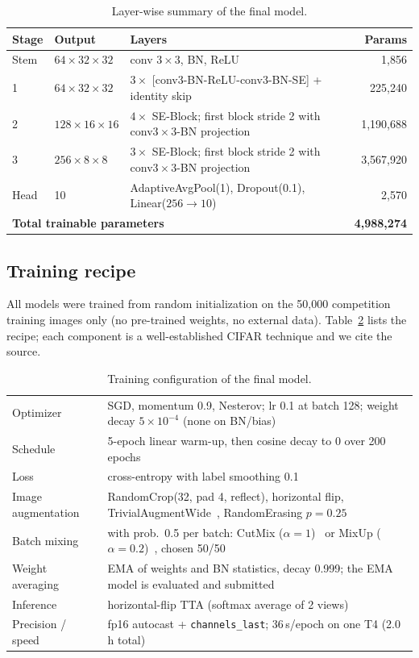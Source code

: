 \documentclass[11pt]{article}
\begin{document}
\begin{table}[t]
\centering\small
\caption{Layer-wise summary of the final model.}
\label{tab:arch}
\begin{tabular}{lllr}
\toprule
Stage & Output & Layers & Params \\
\midrule
Stem & $64\times32\times32$ & conv $3\times3$, BN, ReLU & 1,856 \\
1 & $64\times32\times32$ & $3\times$ [conv3-BN-ReLU-conv3-BN-SE] + identity skip & 225,240 \\
2 & $128\times16\times16$ & $4\times$ SE-Block; first block stride 2 with conv$3\times3$-BN projection & 1,190,688 \\
3 & $256\times8\times8$ & $3\times$ SE-Block; first block stride 2 with conv$3\times3$-BN projection & 3,567,920 \\
Head & 10 & AdaptiveAvgPool(1), Dropout(0.1), Linear($256\to10$) & 2,570 \\
\midrule
\multicolumn{3}{l}{\textbf{Total trainable parameters}} & \textbf{4,988,274} \\
\bottomrule
\end{tabular}
\end{table}

\subsection{Training recipe}
All models were trained from random initialization on the 50{,}000 competition training images only (no pre-trained weights, no external data). Table~\ref{tab:recipe} lists the recipe; each component is a well-established CIFAR technique and we cite the source.

\begin{table}[h]
\centering\small
\caption{Training configuration of the final model.}
\label{tab:recipe}
\begin{tabular}{@{}l p{}@{}}
\toprule
Optimizer & SGD, momentum 0.9, Nesterov; lr 0.1 at batch 128; weight decay $5\!\times\!10^{-4}$ (none on BN/bias) \\
Schedule & 5-epoch linear warm-up, then cosine decay to 0 over 200 epochs~\cite{loshchilov2017} \\
Loss & cross-entropy with label smoothing 0.1~\cite{szegedy2016} \\
Image augmentation & RandomCrop(32, pad 4, reflect), horizontal flip, TrivialAugmentWide~\cite{muller2021}, RandomErasing $p{=}0.25$~\cite{zhong2020} \\
Batch mixing & with prob.\ 0.5 per batch: CutMix ($\alpha{=}1$)~\cite{yun2019} or MixUp ($\alpha{=}0.2$)~\cite{zhang2018}, chosen 50/50 \\
Weight averaging & EMA of weights and BN statistics, decay 0.999; the EMA model is evaluated and submitted~\cite{polyak1992} \\
Inference & horizontal-flip TTA (softmax average of 2 views) \\
Precision / speed & fp16 autocast + \texttt{channels\_last}; 36\,s/epoch on one T4 (2.0\,h total) \\
\bottomrule
\end{tabular}
\end{table}
\end{document}
